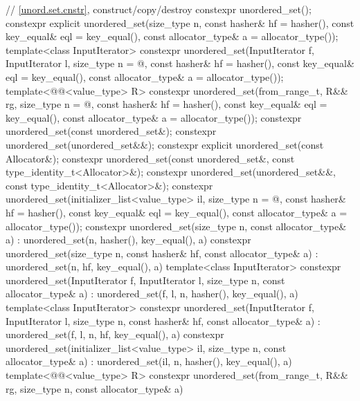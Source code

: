 \begin{codeblock}
{{    // \ref{unord.set.cnstr}, construct/copy/destroy
    constexpr unordered_set();
    constexpr explicit unordered_set(size_type n, const hasher& hf = hasher(),
                                     const key_equal& eql = key_equal(),
                                     const allocator_type& a = allocator_type());
    template<class InputIterator>
      constexpr unordered_set(InputIterator f, InputIterator l,
                              size_type n = @\seebelow@, const hasher& hf = hasher(),
                              const key_equal& eql = key_equal(),
                              const allocator_type& a = allocator_type());
    template<@@<value_type> R>
      constexpr unordered_set(from_range_t, R&& rg,
                              size_type n = @\seebelow@, const hasher& hf = hasher(),
                              const key_equal& eql = key_equal(),
                              const allocator_type& a = allocator_type());
    constexpr unordered_set(const unordered_set&);
    constexpr unordered_set(unordered_set&&);
    constexpr explicit unordered_set(const Allocator&);
    constexpr unordered_set(const unordered_set&, const type_identity_t<Allocator>&);
    constexpr unordered_set(unordered_set&&, const type_identity_t<Allocator>&);
    constexpr unordered_set(initializer_list<value_type> il,
                            size_type n = @\seebelow@, const hasher& hf = hasher(),
                            const key_equal& eql = key_equal(),
                            const allocator_type& a = allocator_type());
    constexpr unordered_set(size_type n, const allocator_type& a)
      : unordered_set(n, hasher(), key_equal(), a) { }
    constexpr unordered_set(size_type n, const hasher& hf, const allocator_type& a)
      : unordered_set(n, hf, key_equal(), a) { }
    template<class InputIterator>
      constexpr unordered_set(InputIterator f, InputIterator l, size_type n,
                              const allocator_type& a)
        : unordered_set(f, l, n, hasher(), key_equal(), a) { }
    template<class InputIterator>
      constexpr unordered_set(InputIterator f, InputIterator l, size_type n, const hasher& hf,
                              const allocator_type& a)
      : unordered_set(f, l, n, hf, key_equal(), a) { }
    constexpr unordered_set(initializer_list<value_type> il, size_type n,
                            const allocator_type& a)
      : unordered_set(il, n, hasher(), key_equal(), a) { }
    template<@@<value_type> R>
      constexpr unordered_set(from_range_t, R&& rg, size_type n, const allocator_type& a)
}}
\end{codeblock}
